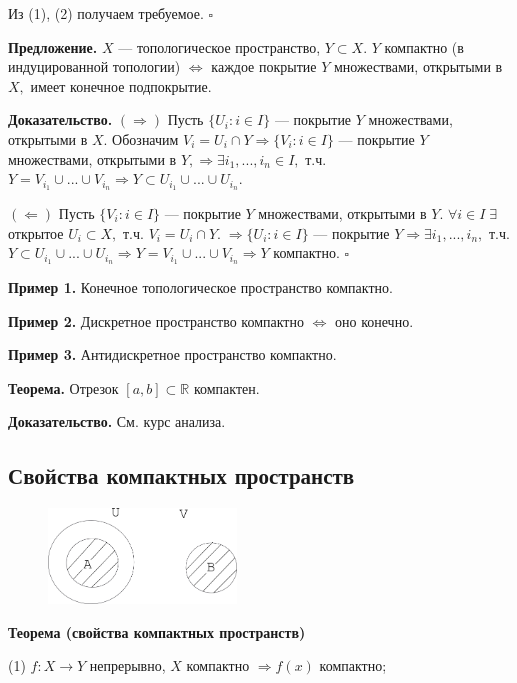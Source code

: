 \documentclass[12pt,a4paper]{article}
\begin{document}
Из (1), (2) получаем требуемое. $\square$ 

\textbf{Предложение.} $X$ --- топологическое пространство, $Y \subset X.$ $Y$ компактно (в индуцированной топологии) $\Leftrightarrow$ каждое покрытие $Y$ множествами, открытыми в $X,$ имеет конечное подпокрытие. 

\textbf{Доказательство.} $(\Rightarrow)$ Пусть $\{U_{i}\!: i \in I\}$ --- покрытие $Y$ множествами, открытыми в $X.$ Обозначим $V_{i} = U_{i} \cap Y \Rightarrow \{V_{i}\!: i \in I\}$ --- покрытие $Y$ множествами, открытыми в $Y, \Rightarrow \exists i_{1}, ..., i_{n} \in I,$ т.ч. $Y = V_{i_{1}} \cup ... \cup V_{i_{n}} \Rightarrow Y \subset U_{i_{1}} \cup ... \cup U_{i_{n}}.$

$(\Leftarrow)$ Пусть $\{V_{i}\!: i \in I\}$ --- покрытие $Y$ множествами, открытыми в $Y.$ $\forall i \in I \; \exists$ открытое $U_{i} \subset X,$ т.ч. $V_{i} = U_{i} \cap Y. \; \Rightarrow \{U_{i}\!: i \in I\}$ --- покрытие $Y \Rightarrow \exists i_{1}, ..., i_{n},$ т.ч. $Y \subset U_{i_{1}} \cup ... \cup U_{i_{n}} \Rightarrow Y = V_{i_{1}} \cup ... \cup V_{i_{n}} \Rightarrow Y$ компактно. $\square$

\textbf{Пример 1.} Конечное топологическое пространство компактно.

\textbf{Пример 2.} Дискретное пространство компактно $\Leftrightarrow$ оно конечно.

\textbf{Пример 3.} Антидискретное пространство компактно. 

\textbf{Теорема.} Отрезок $[a, b] \subset \mathbb{R}$ компактен. 

\textbf{Доказательство.} См. курс анализа. 

\subsection{Свойства компактных пространств}

\begin{figure}
	\includegraphics[width = 5cm]{lect9_1.png}
\end{figure}

\textbf{Теорема (свойства компактных пространств)} 

(1) $f: X \to Y$ непрерывно, $X$ компактно $\Rightarrow f(x)$ компактно;
\end{document}
